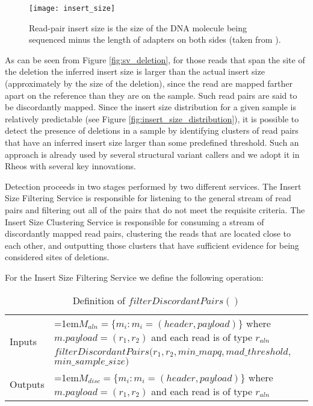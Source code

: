 \begin{figure}[H]
    \texttt{[image: insert\_size]}
    \centering
    \caption {Read-pair insert size is the size of the DNA molecule being sequenced minus the length of adapters on both sides (taken from \autocite{turner2014assessment}).}
    \label{fig:insert_size}
\end{figure}

As can be seen from Figure \ref{fig:sv_deletion}, for those reads that span the site of the deletion the inferred insert size is larger than the actual insert size (approximately by the size of the deletion), since the read are mapped farther apart on the reference than they are on the sample. Such read pairs are said to be discordantly mapped. Since the insert size distribution for a given sample is relatively predictable (see Figure \ref{fig:insert_size_distribution}), it is possible to detect the presence of deletions in a sample by identifying clusters of read pairs that have an inferred insert size larger than some predefined threshold. Such an approach is already used by several structural variant callers\autocites{rausch2012delly}{layer2014lumpy} and we adopt it in Rheos with several key innovations.

Detection proceeds in two stages performed by two different services. The Insert Size Filtering Service is responsible for listening to the general stream of read pairs and filtering out all of the pairs that do not meet the requisite criteria. The Insert Size Clustering Service is responsible for consuming a stream of discordantly mapped read pairs, clustering the reads that are located close to each other, and outputting those clusters that have sufficient evidence for being considered sites of deletions.

For the Insert Size Filtering Service we define the following operation:

\bgroup
\def\arraystretch{1.5}
\begin{table}[!ht]
    \caption{Definition of $filterDiscordantPairs()$}
    \label{tab:op_filter_discordant_pairs}
    {\begin{tabular}{l|p{12cm}}
    \toprule
    \multirow{2}{*}{Inputs} & \hangindent=1em$M_{aln} = \{m_i: m_i = (header, payload)\}$ where $m.payload = (r_1,r_2)$ and each read is of type $r_{aln}$\\
    \cline{2-2}
    \multirow{2}{*}{Operation} & $filterDiscordantPairs(r_1,r_2, min\_mapq, mad\_threshold,$ $min\_sample\_size)$\\
     \cline{2-2}
    \multirow{2}{*}{Outputs} & \hangindent=1em$M_{disc} = \{m_i: m_i = (header, payload)\}$ where $m.payload = (r_1,r_2)$ and each read is of type $r_{aln}$\\
    \bottomrule
    \end{tabular}}
\end{table}
\egroup

